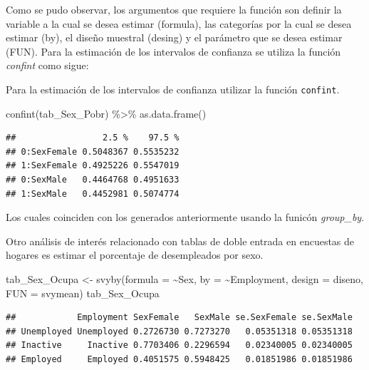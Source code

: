 \documentclass[
  12pt,
]{book}
\newenvironment{Shaded}{\begin{snugshade}}{\end{snugshade}}
\newcommand{\AttributeTok}[1]{\textcolor[rgb]{0.77,0.63,0.00}{#1}}
\newcommand{\FunctionTok}[1]{\textcolor[rgb]{0.00,0.00,0.00}{#1}}
\newcommand{\NormalTok}[1]{#1}
\newcommand{\OtherTok}[1]{\textcolor[rgb]{0.56,0.35,0.01}{#1}}
\newcommand{\SpecialCharTok}[1]{\textcolor[rgb]{0.00,0.00,0.00}{#1}}
\begin{document}
Como se pudo observar, los argumentos que requiere la función son definir la variable a la cual se desea estimar (formula), las categorías por la cual se desea estimar (by), el diseño muestral (desing) y el parámetro que se desea estimar (FUN). Para la estimación de los intervalos de confianza se utiliza la función \emph{confint} como sigue:

Para la estimación de los intervalos de confianza utilizar la función \texttt{confint}.

\begin{Shaded}
\begin{Highlighting}[]
\FunctionTok{confint}\NormalTok{(tab\_Sex\_Pobr) }\SpecialCharTok{\%\textgreater{}\%} \FunctionTok{as.data.frame}\NormalTok{()}
\end{Highlighting}
\end{Shaded}

\begin{verbatim}
##                 2.5 %    97.5 %
## 0:SexFemale 0.5048367 0.5535232
## 1:SexFemale 0.4925226 0.5547019
## 0:SexMale   0.4464768 0.4951633
## 1:SexMale   0.4452981 0.5074774
\end{verbatim}

Los cuales coinciden con los generados anteriormente usando la funicón \emph{group\_by}.

Otro análisis de interés relacionado con tablas de doble entrada en encuestas de hogares es estimar el porcentaje de desempleados por sexo.

\begin{Shaded}
\begin{Highlighting}[]
\NormalTok{tab\_Sex\_Ocupa }\OtherTok{\textless{}{-}} \FunctionTok{svyby}\NormalTok{(}\AttributeTok{formula =} \SpecialCharTok{\textasciitilde{}}\NormalTok{Sex,  }\AttributeTok{by =} \SpecialCharTok{\textasciitilde{}}\NormalTok{Employment,}
                       \AttributeTok{design =}\NormalTok{ diseno, }\AttributeTok{FUN =}\NormalTok{ svymean)}
\NormalTok{tab\_Sex\_Ocupa}
\end{Highlighting}
\end{Shaded}

\begin{verbatim}
##            Employment SexFemale   SexMale se.SexFemale se.SexMale
## Unemployed Unemployed 0.2726730 0.7273270   0.05351318 0.05351318
## Inactive     Inactive 0.7703406 0.2296594   0.02340005 0.02340005
## Employed     Employed 0.4051575 0.5948425   0.01851986 0.01851986
\end{verbatim}
\end{document}
